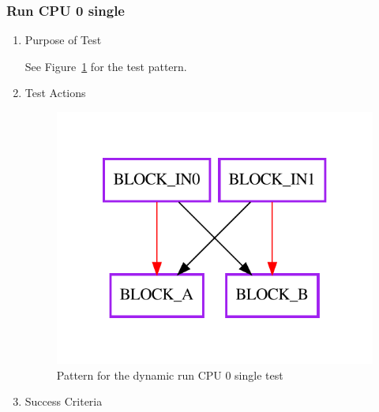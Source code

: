 \documentclass[12pt,a4paper]{report}
\begin{document}
\subsubsection{Run CPU 0 single}
\begin{enumerate}
	\item Purpose of Test

	See Figure~\ref{fig:Pattern_for_the_dynamic_run_CPU_0_single_test} for the test pattern.
	\item Test Actions
    \begin{figure}
        \centering 
        \includegraphics{TestPattern/dynamic_basic_run_cpu0_single.pdf}
        \caption{Pattern for the dynamic run CPU 0 single test}
        \label{fig:Pattern_for_the_dynamic_run_CPU_0_single_test}
    \end{figure}
	\item Success Criteria
\end{enumerate}
\end{document}
